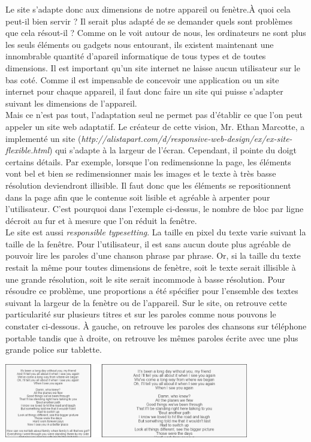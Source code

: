 \documentclass{article}
\begin{document}
Le site s'adapte donc aux dimensions de notre appareil ou fen\`etre.\`A quoi cela peut-il bien servir ? Il serait plus adapté de se demander quels sont probl\`emes que cela r\'esout-il ? Comme on le voit autour de nous, les ordinateurs ne sont plus les seuls \'el\'ements ou gadgets nous entourant, ils existent maintenant une innombrable quantit\'e d'apareil informatique de tous types et de toutes dimensions. Il est important qu'un site internet ne laisse aucun utilisateur sur le bas cot\'e. Comme il est impensable de concevoir une application ou un site internet pour chaque appareil, il faut donc faire un site qui puisse s'adapter suivant les dimensions de l'appareil. 
\vspace{0.5cm}\\
Mais ce n'est pas tout, l'adaptation seul ne permet pas d'\'etablir ce que l'on peut appeler un site web adaptatif. Le cr\'eateur de cette vision, Mr. Ethan Marcotte, a implement\'e un site (\textit{http://alistapart.com/d/responsive-web-design/ex/ex-site-flexible.html}) qui s'adapte \`a la largeur de l'\'ecran. Cependant, il pointe du doigt certains d\'etails. Par exemple, lorsque l'on redimensionne la page, les \'el\'ements vont bel et bien se redimensionner mais les images et le texte \`a tr\`es basse r\'esolution deviendront illisible. Il faut donc que les \'el\'ements se repositionnent dans la page afin que le contenue soit lisible et agr\'eable \`a arpenter pour l'utilisateur. C'est pourquoi dans l'exemple ci-dessus, le nombre de bloc par ligne d\'ecroit au fur et \`a mesure que l'on r\'eduit la fen\^etre.
\vspace{0.5cm}\\

Le site est aussi \textit{responsible typesetting}. La taille en pixel du texte varie suivant la taille de la fen\^etre. Pour l'utilisateur, il est sans aucun doute plus agr\'eable de pouvoir lire les paroles d'une chanson phrase par phrase. Or, si la taille du texte restait la m\^eme pour toutes dimensions de fen\`etre, soit le texte serait illisible \`a une grande r\'esolution, soit le site serait incommode \`a basse r\'esolution. Pour r\'esoudre ce probl\`eme, une proportions a \'et\'e sp\'ecifier pour l'ensemble des textes suivant la largeur de la fen\`etre ou de l'appareil. Sur le site, on retrouve cette particularit\'e sur plusieurs titres et sur les paroles comme nous pouvons le constater ci-dessous. \`A gauche, on retrouve les paroles des chansons sur t\'el\'ephone portable tandis que \`a droite, on retrouve les m\^emes paroles \'ecrite avec une plus grande police sur tablette.
\begin{center}
\vspace{0.5cm}
\includegraphics[width=0.8\textwidth]{textes}
\vspace{0.5cm}\\
\end{center}
\end{document}
